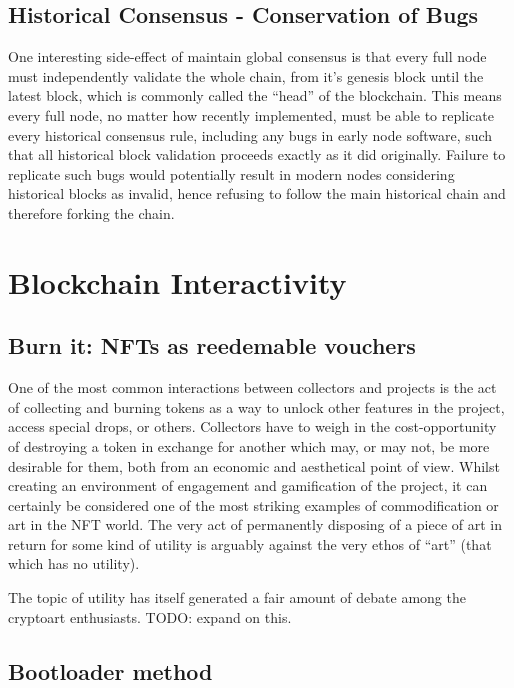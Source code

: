 \subsection{Historical Consensus - Conservation of Bugs}

One interesting side-effect of maintain global consensus is that every full node must independently validate the whole chain, from it's genesis block until the latest block, which is commonly called the ``head'' of the blockchain. This means every full node, no matter how recently implemented, must be able to replicate every historical consensus rule, including any bugs in early node software, such that all historical block validation proceeds exactly as it did originally. Failure to replicate such bugs would potentially result in modern nodes considering historical blocks as invalid, hence refusing to follow the main historical chain and therefore forking the chain.


\section{Blockchain Interactivity}



\subsection{Burn it: NFTs as reedemable vouchers}

One of the most common interactions between collectors and projects is the act of collecting and burning tokens as a way to unlock other features in the project, access special drops, or others. Collectors have to weigh in the cost-opportunity of destroying a token in exchange for another which may, or may not, be more desirable for them, both from an economic and aesthetical point of view. Whilst creating an environment of engagement and gamification of the project, it can certainly be considered one of the most striking examples of commodification or art in the NFT world. The very act of permanently disposing of a piece of art in return for some kind of utility is arguably against the very ethos of ``art'' (that which has no utility).

The topic of utility has itself generated a fair amount of debate among the cryptoart enthusiasts. TODO: expand on this.

\subsection{Bootloader method}

